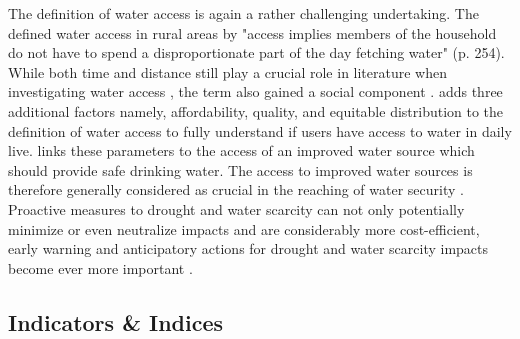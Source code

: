The definition of water access is again a rather challenging undertaking. The \textcite{worldbankWorldDevelopmentReport1997} defined water access in rural areas by "access implies members of the household do not have to spend a disproportionate part of the day fetching water" (p. 254). While both time and distance still play a crucial role in literature when investigating water access \autocite{cassiviDrinkingWaterAccessibility2019,cassiviEvaluatingSelfreportedMeasures2021,emenikeAccessingSafeDrinking2017}, the term also gained a social component \autocite{emenikeAccessingSafeDrinking2017,mitlinUnaffordableUndrinkable}. \Textcite{obeng-odoomAccessWater2012} adds three additional factors namely, affordability, quality, and equitable distribution to the definition of water access to fully understand if users have access to water in daily live. \Textcite{unitednationsDeepeningDemocracyFragmented2002} links these parameters to the access of an improved water source which should provide safe drinking water. The access to improved water sources is therefore generally considered as crucial in the reaching of water security \autocite{cdcAssessingAccessWater2022}.\newline 
Proactive measures to drought and water scarcity can not only potentially minimize or even neutralize impacts and are considerably more cost-efficient, early warning and anticipatory actions for drought and water scarcity impacts become ever more important \autocite{faoProgressLevelWater2021,idmpDroughtWaterScarcity2022,worldbankHighDryClimate2016}.

\subsection{Indicators \& Indices}\label{subsec:indicators}

